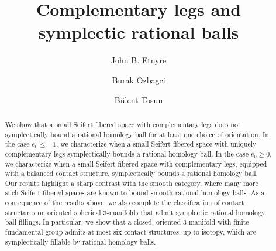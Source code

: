 \documentclass[11pt]{amsart}
\theoremstyle{plain}
\theoremstyle{definition}
\theoremstyle{remark}
\numberwithin{theorem}{section}
\begin{document}
\title {Complementary legs  and symplectic rational balls}


\author{John B. Etnyre}

\author{Burak Ozbagci}

\author{B\"{u}lent Tosun}

\address{Department of Mathematics \\ Georgia Institute of Technology \\ Atlanta \\ Georgia}


\address{Department of Mathematics \\ Ko\c{c} University \\ Istanbul \\ Turkey}



\address{University of Alabama\\Tuscaloosa\\Alabama}




\begin{abstract} 
We show that a small Seifert fibered space with complementary legs does not symplectically bound a rational homology ball for at least one choice of orientation. In the case $e_0\leq -1$, we characterize when a small Seifert fibered space with uniquely complementary legs symplectically bounds a rational homology ball. In the case $e_0\geq 0$, we characterize when a small Seifert fibered space with complementary legs,  equipped with a balanced contact structure, symplectically bounds a rational homology ball. Our results highlight a sharp contrast with the smooth category, where many more such Seifert fibered spaces are known to bound smooth rational homology balls. As a consequence of the results above, we also complete the classification of contact structures on oriented spherical $3$-manifolds that admit symplectic rational homology ball fillings. In particular, we show that a closed, oriented $3$-manifold with finite fundamental group admits at most six contact structures, up to isotopy, which are symplectically fillable by rational homology balls.
\end{abstract}


\maketitle
\end{document}
